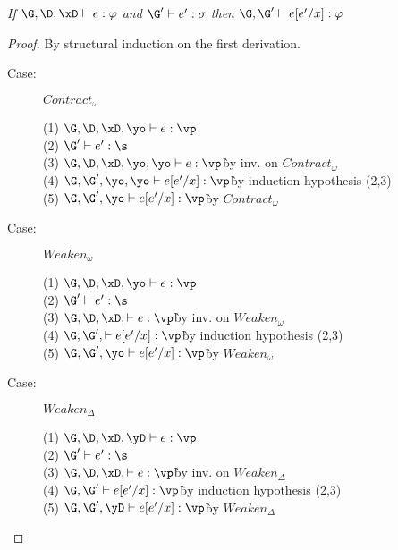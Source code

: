 
\begin{lemma}
\emph{If $\G, \D, \xD \vdash e : \varphi$ and $\G' \vdash e' : \sigma$ then $\G, \G' \vdash e[e'/x] : \varphi$}
\end{lemma}
\begin{proof}
By structural induction on the first derivation.

\begin{description}

\item[Case:] $Contract_\omega$
\begin{tabbing}
    (1) $\G, \D, \xD, \yo \vdash e : \vp$\\
    (2) $\G' \vdash e' : \s$\\
    (3) $\G, \D, \xD, \yo, \yo \vdash e : \vp$\` by inv. on $Contract_\omega$\\
    (4) $\G, \G', \yo, \yo \vdash e[e'/x] : \vp$\` by induction hypothesis (2,3)\\
    (5) $\G, \G', \yo \vdash e[e'/x] : \vp$\` by $Contract_\omega$\\
\end{tabbing}

\item[Case:] $Weaken_\omega$
\begin{tabbing}
    (1) $\G, \D, \xD, \yo \vdash e : \vp$\\
    (2) $\G' \vdash e' : \s$\\
    (3) $\G, \D, \xD, \vdash e : \vp$\` by inv. on $Weaken_\omega$\\
    (4) $\G, \G', \vdash e[e'/x] : \vp$\` by induction hypothesis (2,3)\\
    (5) $\G, \G', \yo \vdash e[e'/x] : \vp$\` by $Weaken_\omega$\\
\end{tabbing}

\item[Case:] $Weaken_\Delta$
\begin{tabbing}
    (1) $\G, \D, \xD, \yD \vdash e : \vp$\\
    (2) $\G' \vdash e' : \s$\\
    (3) $\G, \D, \xD, \vdash e : \vp$\` by inv. on $Weaken_\Delta$\\
    (4) $\G, \G' \vdash e[e'/x] : \vp$\` by induction hypothesis (2,3)\\
    (5) $\G, \G', \yD \vdash e[e'/x] : \vp$\` by $Weaken_\Delta$\\
\end{tabbing}


\end{description}
\end{proof}
